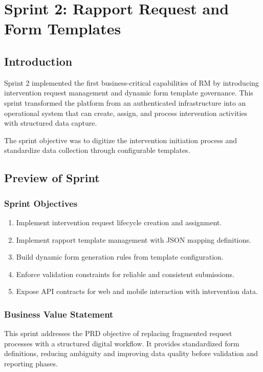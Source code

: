 \chapter{Sprint 2: Rapport Request and Form Templates}

\section{Introduction}

Sprint 2 implemented the first business-critical capabilities of RM by introducing intervention request management and dynamic form template governance. This sprint transformed the platform from an authenticated infrastructure into an operational system that can create, assign, and process intervention activities with structured data capture.

The sprint objective was to digitize the intervention initiation process and standardize data collection through configurable templates.

\section{Preview of Sprint}

\subsection{Sprint Objectives}

\begin{enumerate}
\item Implement intervention request lifecycle creation and assignment.
\item Implement rapport template management with JSON mapping definitions.
\item Build dynamic form generation rules from template configuration.
\item Enforce validation constraints for reliable and consistent submissions.
\item Expose API contracts for web and mobile interaction with intervention data.
\end{enumerate}

\subsection{Business Value Statement}

This sprint addresses the PRD objective of replacing fragmented request processes with a structured digital workflow. It provides standardized form definitions, reducing ambiguity and improving data quality before validation and reporting phases.


